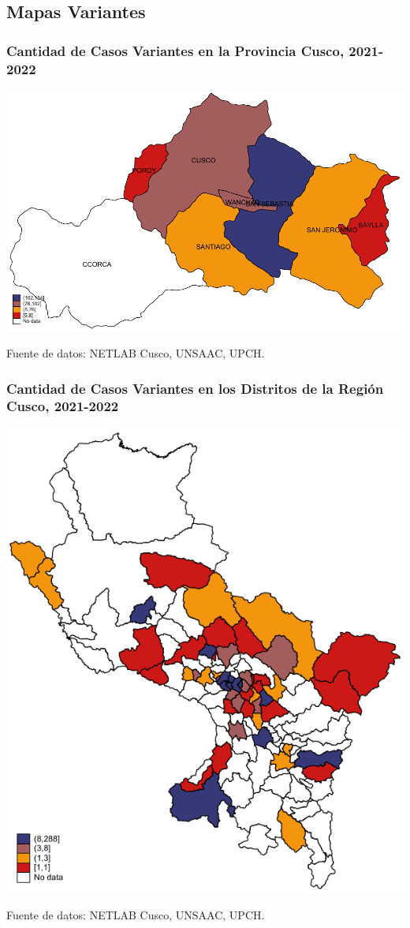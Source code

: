 \documentclass[xcolor=table]{beamer}
\begin{document}
\subsection{Mapas Variantes}
	\begin{frame}[label=mapa_provincia_cusco]
	\frametitle{Cantidad de Casos Variantes en la Provincia Cusco, 2021-2022}
	\begin{center}
		\includegraphics[width=0.65\linewidth]{../figuras/variantes_distrital_cusco.pdf}
	\end{center}
	{\tiny Fuente de datos: NETLAB Cusco, UNSAAC, UPCH.}
	
	\hyperlink{mapa_variantes}{}
	\end{frame}

	\begin{frame}[label=mapa_distrital]
	\frametitle{Cantidad de Casos Variantes en los Distritos de la Región Cusco, 2021-2022}
	\begin{center}
		\includegraphics[width=0.55\linewidth]{../figuras/variantes_distrital.pdf}
	\end{center}
	{\tiny Fuente de datos: NETLAB Cusco, UNSAAC, UPCH.}
	
	\hyperlink{mapa_variantes}{}
	\end{frame}
\end{document}

